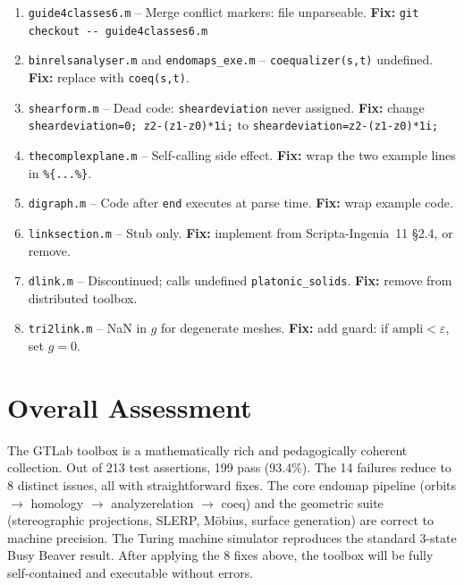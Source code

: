 \documentclass[12pt,a4paper]{report}
\newcommand{\mf}[1]{\texttt{#1}}
\begin{document}
\begin{enumerate}[label=\textbf{I\arabic*.}]
\item \mf{guide4classes6.m} -- Merge conflict markers: file unparseable. \textbf{Fix:} \lstinline|git checkout -- guide4classes6.m|
\item \mf{binrelsanalyser.m} and \mf{endomaps\_exe.m} -- \mf{coequalizer(s,t)} undefined. \textbf{Fix:} replace with \mf{coeq(s,t)}.
\item \mf{shearform.m} -- Dead code: \mf{sheardeviation} never assigned. \textbf{Fix:} change \lstinline|sheardeviation=0; z2-(z1-z0)*1i;| to \lstinline|sheardeviation=z2-(z1-z0)*1i;|
\item \mf{thecomplexplane.m} -- Self-calling side effect. \textbf{Fix:} wrap the two example lines in \lstinline|%{...%}|.
\item \mf{digraph.m} -- Code after \mf{end} executes at parse time. \textbf{Fix:} wrap example code.
\item \mf{linksection.m} -- Stub only. \textbf{Fix:} implement from Scripta-Ingenia~11 \S2.4, or remove.
\item \mf{dlink.m} -- Discontinued; calls undefined \mf{platonic\_solids}. \textbf{Fix:} remove from distributed toolbox.
\item \mf{tri2link.m} -- NaN in $g$ for degenerate meshes. \textbf{Fix:} add guard: if $\mathrm{ampli}<\varepsilon$, set $g=0$.
\end{enumerate}

\newpage
\section*{Overall Assessment}

The GTLab toolbox is a mathematically rich and pedagogically coherent collection. Out of 213 test assertions, 199 pass (93.4\%). The 14 failures reduce to 8 distinct issues, all with straightforward fixes. The core endomap pipeline (orbits $\to$ homology $\to$ analyzerelation $\to$ coeq) and the geometric suite (stereographic projections, SLERP, Möbius, surface generation) are correct to machine precision. The Turing machine simulator reproduces the standard 3-state Busy Beaver result. After applying the 8 fixes above, the toolbox will be fully self-contained and executable without errors.
\end{document}
